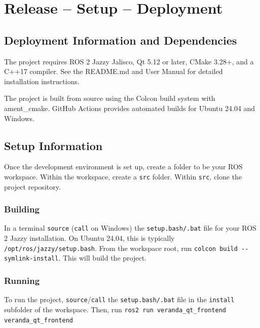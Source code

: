 
\chapter{Release -- Setup -- Deployment}
\section{Deployment Information and Dependencies}
The project requires ROS 2 Jazzy Jalisco, Qt 5.12 or later, CMake 3.28+, and a C++17 compiler. See the README.md and User Manual for detailed installation instructions.

The project is built from source using the Colcon build system with ament\_cmake. GitHub Actions provides automated builds for Ubuntu 24.04 and Windows.

\section{Setup Information}
Once the development environment is set up, create a folder to be your ROS workspace. Within the workspace, create a \lstinline|src| folder. Within \lstinline|src|, clone the project repository.

\subsection*{Building}
In a terminal \lstinline|source| (\lstinline|call| on Windows) the \lstinline|setup.bash/.bat| file for your ROS 2 Jazzy installation. On Ubuntu 24.04, this is typically \lstinline|/opt/ros/jazzy/setup.bash|. From the workspace root, run \lstinline|colcon build --symlink-install|. This will build the project.

\subsection*{Running}
To run the project, \lstinline|source|/\lstinline|call| the \lstinline|setup.bash/.bat| file in the \lstinline|install| subfolder of the workspace. Then, run \lstinline|ros2 run veranda_qt_frontend veranda_qt_frontend|